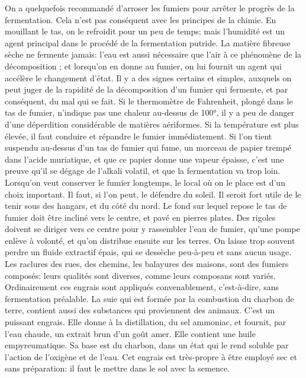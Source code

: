 On a quelquefois recommandé d'arroser les fumiers pour arrêter le progrès de la fermentation. Cela n'est pas conséquent avec les principes de la chimie. En mouillant le tas, on le refroidit pour un peu de temps; mais l'humidité est un agent principal dans\setcounter{page}{207} le procédé de la fermentation putride. La matière fibreuse sèche ne fermente jamais: l'eau est aussi nécessaire que l'air à ce phénomène de la décomposition ; et lorsqu'on en donne au fumier, on lui fournit un agent qui accélère le changement d'état.
Il y a des signes certains et simples, auxquels on peut juger de la rapidité de la décomposition d'un fumier qui fermente, et par conséquent, du mal qui se fait.
Si le thermomètre de Fahrenheit, plongé dans le tas de fumier, n'indique pas une chaleur au-dessus de 100°, il y a peu de danger d'une déperdition considérable de matières aériformes. Si la température est plus élevée, il faut conduire et répandre le fumier immédiatement.
Si l'on tient suspendu au-dessus d'un tas de fumier qui fume, un morceau de papier trempé dans l'acide muriatique, et que ce papier donne une vapeur épaisse, c'est une preuve qu'il se dégage de l'alkali volatil, et que la fermentation va trop loin.
Lorsqu'on veut conserver le fumier longtemps, le local où on le place est d'un choix important. Il faut, si l'on peut, le défendre du soleil. Il seroit fort utile de le tenir sous des hangars, et du côté du nord. Le fond sur lequel repose le tas de fumier doit être\setcounter{page}{208} incliné vers le centre, et pavé en pierres plates. Des rigoles doivent se diriger vers ce centre pour y rassembler l'eau de fumier, qu'une pompe enlève à volonté, et qu'on distribue ensuite sur les terres. On laisse trop souvent perdre un fluide extractif épais, qui se dessèche peu-à-peu et sans aucun usage.
Les raclures des rues, des chemins, les balayures des maisons, sont des fumiers composés: leurs qualités sont diverses, comme leurs composans sont variés. Ordinairement ces engrais sont appliqués convenablement, c'est-à-dire, sans fermentation préalable.
La suie qui est formée par la combustion du charbon de terre, contient aussi des substances qui proviennent des animaux. C'est un puissant engrais. Elle donne à la distillation, du sel ammoniac, et fournit, par l'eau chaude, un extrait brun d'un goût amer. Elle contient une huile empyreumatique. Sa base est du charbon, dans un état qui le rend soluble par l'action de l'oxigène et de l'eau.
Cet engrais est très-propre à être employé sec et sans préparation: il faut le mettre dans le sol avec la semence.

